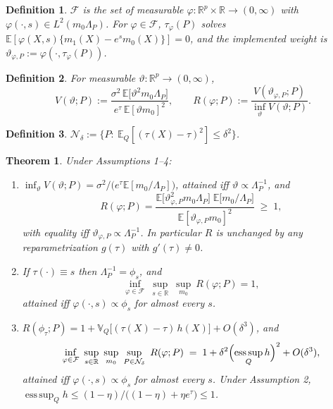 \documentclass{article}
\newtheorem{definition}{Definition}
\newtheorem{theorem}{Theorem}
\begin{document}
\begin{definition}
$\mathcal{F}$ is the set of measurable $\varphi:\mathbb{R}^p\times\mathbb{R}\to(0,\infty)$ with $\varphi(\cdot,s)\in L^2(m_0\Lambda_P)$.  For $\varphi\in\mathcal{F}$, $\tau_\varphi(P)$ solves $\mathbb{E}[\varphi(X,s)\{m_1(X)-e^{s}m_0(X)\}]=0$, and the \emph{implemented weight} is $\vartheta_{\varphi,P}:=\varphi(\cdot,\tau_\varphi(P))$.
\end{definition}

\begin{definition}
For measurable $\vartheta:\mathbb{R}^p\to(0,\infty)$,
\[
  V(\vartheta;P):=\frac{\sigma^2\,\mathbb{E}\bigl[\vartheta^2m_0\Lambda_P\bigr]}{e^{\tau}\,\mathbb{E}[\vartheta m_0]^2},
  \qquad
  R(\varphi;P):=\frac{V(\vartheta_{\varphi,P};P)}{\inf_\vartheta V(\vartheta;P)}.
\]
\end{definition}

\begin{definition}
$\mathcal{N}_\delta:=\bigl\{P:\ \mathbb{E}_Q[(\tau(X)-\tau)^2]\le\delta^2\bigr\}$.
\end{definition}

\begin{theorem}
\label{thm:minimax}
Under Assumptions 1--4:
\begin{enumerate}[label=(\roman*)]
\item $\inf_\vartheta V(\vartheta;P)=\sigma^2/\bigl(e^{\tau}\mathbb{E}[m_0/\Lambda_P]\bigr)$, attained iff $\vartheta\propto\Lambda_P^{-1}$, and
\[
  R(\varphi;P)
  = \frac{\mathbb{E}\bigl[\vartheta_{\varphi,P}^2m_0\Lambda_P\bigr]\;\mathbb{E}\bigl[m_0/\Lambda_P\bigr]}{\mathbb{E}[\vartheta_{\varphi,P}m_0]^2}
  \;\ge\;1,
\]
with equality iff $\vartheta_{\varphi,P}\propto\Lambda_P^{-1}$.  In particular $R$ is unchanged by any reparametrization $g(\tau)$ with $g'(\tau)\neq0$.
\item If $\tau(\cdot)\equiv s$ then $\Lambda_P^{-1}=\phi_s$, and
\[
  \inf_{\varphi\in\mathcal{F}}\ \sup_{s\in\mathbb{R}}\ \sup_{m_0}\ R(\varphi;P)=1,
\]
attained iff $\varphi(\cdot,s)\propto\phi_s$ for almost every $s$.
\item $R(\phi_\tau;P)=1+\mathbb{V}_Q\bigl[(\tau(X)-\tau)\,h(X)\bigr]+O(\delta^3)$, and
\begin{equation}
  \label{eq:minimaxvalue}
  \inf_{\varphi\in\mathcal{F}}\ \sup_{s\in\mathbb{R}}\ \sup_{m_0}\ \sup_{P\in\mathcal{N}_\delta}\ R(\varphi;P)
  \;=\;1+\delta^2\Bigl(\operatorname*{ess\,sup}_Q h\Bigr)^2+O(\delta^3),
\end{equation}
attained iff $\varphi(\cdot,s)\propto\phi_s$ for almost every $s$.  Under Assumption 2, $\operatorname*{ess\,sup}_Q h\le(1-\eta)/\bigl((1-\eta)+\eta e^{\tau}\bigr)\le1$.
\end{enumerate}
\end{theorem}
\end{document}
